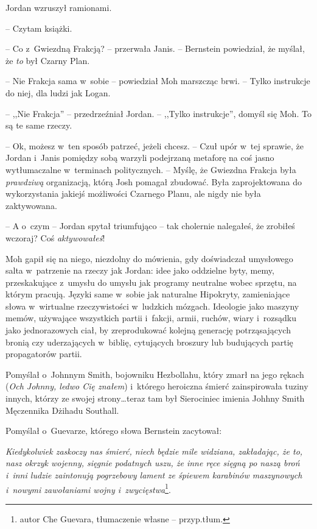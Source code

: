 \documentclass[oneside,polish,11pt,sfheadings]{mwbk}
\begin{document}
Jordan wzruszył ramionami. 

-- Czytam książki.

-- Co z~Gwiezdną Frakcją? -- przerwała Janis. -- Bernstein powiedział, że
myślał, że \emph{to} był Czarny Plan.

-- Nie Frakcja sama w~sobie -- powiedział Moh marszcząc brwi. -- Tylko
instrukcje do niej, dla ludzi jak Logan.

-- ,,Nie Frakcja'' -- przedrzeźniał Jordan. -- ,,Tylko instrukcje'', domyśl się
Moh. To są te same rzeczy.

-- Ok, możesz w~ten sposób patrzeć, jeżeli chcesz. -- Czuł upór w~tej
sprawie, że Jordan i~Janis pomiędzy sobą warzyli podejrzaną metaforę na
coś jasno wytłumaczalne w~terminach politycznych. -- Myślę, że Gwiezdna
Frakcja była \emph{prawdziwą} organizacją, którą Josh pomagał zbudować.
Była zaprojektowana do wykorzystania jakiejś możliwości Czarnego Planu,
ale nigdy nie była zaktywowana.

-- A o~czym -- Jordan spytał triumfująco -- tak cholernie nalegałeś, że
zrobiłeś wczoraj? Coś \emph{aktywowałeś}!

Moh gapił się na niego, niezdolny do mówienia, gdy doświadczał
umysłowego salta w~patrzenie na rzeczy jak Jordan: idee jako oddzielne
byty, memy, przeskakujące z~umysłu do umysłu jak programy neutralne
wobec sprzętu, na którym pracują. Języki same w~sobie jak naturalne
Hipokryty, zamieniające słowa w~wirtualne rzeczywistości w~ludzkich
mózgach. Ideologie jako maszyny memów, używające wszystkich partii i~fakcji, armii, ruchów, wiary i~rozsądku jako jednorazowych ciał, by
zreprodukować kolejną generację potrząsających bronią czy uderzających w~biblię, cytujących broszury lub budujących partię propagatorów partii.

Pomyślał o~Johnnym Smith, bojowniku Hezbollahu, który zmarł na jego
rękach (\emph{Och Johnny, ledwo Cię znałem}) i~którego heroiczna śmierć
zainspirowała tuziny innych, którzy ze swojej strony\ldots teraz tam był
Sierociniec imienia Johhny Smith Męczennika Dżihadu Southall.

Pomyślał o~Guevarze, którego słowa Bernstein zacytował:

\emph{Kiedykolwiek zaskoczy nas śmierć, niech będzie mile widziana,
zakładając, że to, nasz okrzyk wojenny, sięgnie podatnych uszu, że inne
ręce sięgną po naszą broń i~inni ludzie zaintonują pogrzebowy lament ze
śpiewem karabinów maszynowych i~nowymi zawołaniami wojny i~zwycięstwa}\footnote{autor Che Guevara, tłumaczenie własne -- przyp.tłum.}.
\end{document}
